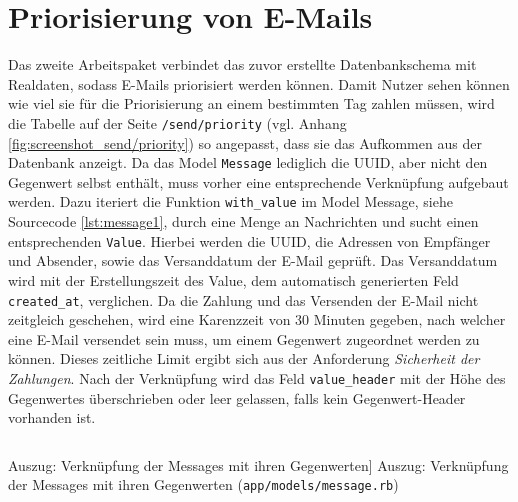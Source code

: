 \section{Priorisierung von E-Mails}
\label{Priorisierung_von_E-Mails}
Das zweite Arbeitspaket verbindet das zuvor erstellte Datenbankschema mit Realdaten, sodass E-Mails priorisiert werden können. Damit Nutzer sehen können wie viel sie für die Priorisierung an einem bestimmten Tag zahlen müssen, wird die Tabelle auf der Seite \texttt{/send/priority} (vgl. Anhang \ref{fig:screenshot_send/priority}) so angepasst, dass sie das Aufkommen aus der Datenbank anzeigt. Da das Model \texttt{Message} lediglich die UUID, aber nicht den Gegenwert selbst enthält, muss vorher eine entsprechende Verknüpfung aufgebaut werden. Dazu iteriert die Funktion \texttt{with\_value} im Model Message, siehe Sourcecode \ref{lst:message1}, durch eine Menge an Nachrichten und sucht einen entsprechenden \texttt{Value}. Hierbei werden die UUID, die Adressen von Empfänger und Absender, sowie das Versanddatum der E-Mail geprüft. Das Versanddatum wird mit der Erstellungszeit des Value, dem automatisch generierten Feld \texttt{created\_at}, verglichen. Da die Zahlung und das Versenden der E-Mail nicht zeitgleich geschehen, wird eine Karenzzeit von 30 Minuten gegeben, nach welcher eine E-Mail versendet sein muss, um einem Gegenwert zugeordnet werden zu können. Dieses zeitliche Limit ergibt sich aus der Anforderung \textit{Sicherheit der Zahlungen}. Nach der Verknüpfung wird das Feld \texttt{value\_header} mit der Höhe des Gegenwertes überschrieben oder leer gelassen, falls kein Gegenwert-Header vorhanden ist.

\begin{listing}[!ht]
\inputminted[firstline=4, lastline=20,linenos]{ruby}{Listings/Pkg2/message.rb}

\caption
    [Auszug: Verknüpfung der Messages mit ihren Gegenwerten]
    {Auszug: Verknüpfung der Messages mit ihren Gegenwerten (\texttt{app/models/message.rb})}

\label{lst:message1}
\end{listing}

